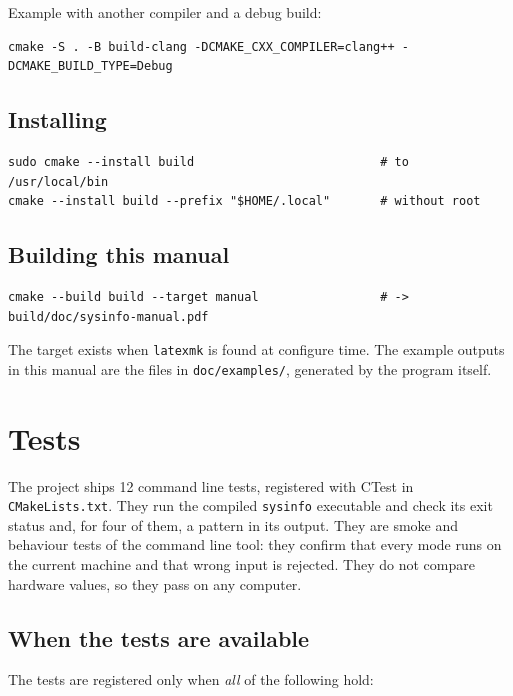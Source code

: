\documentclass[11pt,a4paper]{article}
\newcommand{\cmd}[1]{\texttt{#1}}
\newcommand{\prog}{\texttt{sysinfo}}
\begin{document}
Example with another compiler and a debug build:

\begin{lstlisting}
cmake -S . -B build-clang -DCMAKE_CXX_COMPILER=clang++ -DCMAKE_BUILD_TYPE=Debug
\end{lstlisting}

\subsection{Installing}

\begin{lstlisting}
sudo cmake --install build                          # to /usr/local/bin
cmake --install build --prefix "$HOME/.local"       # without root
\end{lstlisting}

\subsection{Building this manual}

\begin{lstlisting}
cmake --build build --target manual                 # -> build/doc/sysinfo-manual.pdf
\end{lstlisting}

The target exists when \cmd{latexmk} is found at configure time. The example outputs in this manual are the
files in \cmd{doc/examples/}, generated by the program itself.

\section{Tests}
\label{sec:tests}

The project ships 12 command line tests, registered with CTest in \cmd{CMakeLists.txt}. They run the compiled \prog{}
executable and check its exit status and, for four of them, a pattern in its output. They are smoke and behaviour
tests of the command line tool: they confirm that every mode runs on the current machine and that wrong input is
rejected. They do not compare hardware values, so they pass on any computer.

\subsection{When the tests are available}

The tests are registered only when \emph{all} of the following hold:
\end{document}
